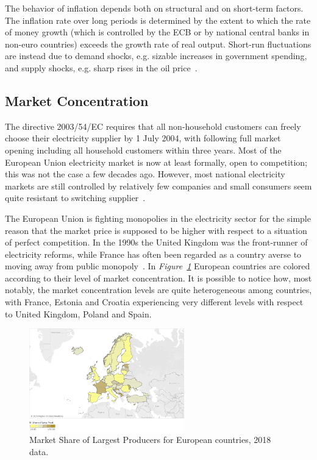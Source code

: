 \documentclass[a4paper,12pt]{book}
\begin{document}
The behavior of inflation depends both on structural and on short-term factors. The inflation rate over long periods is determined by the extent to which the rate of money growth (which is controlled by the ECB or by national central banks in non-euro countries) exceeds the growth rate of real output. Short-run fluctuations are instead due to demand shocks, e.g. sizable increases in government spending, and supply shocks, e.g. sharp rises in the oil price~\cite{ball1993causes}.

\subsection{Market Concentration}

The directive 2003/54/EC requires that all non-household customers can freely choose their electricity supplier by 1 July 2004, with following full market opening including all household customers within three years. Most of the European Union electricity market is now at least formally, open to competition; this was not the case a few decades ago. However, most national electricity markets are still controlled by relatively few companies and small consumers seem quite resistant to switching supplier~\cite{jamasb2005electricity}.

The European Union is fighting monopolies in the electricity sector for the simple reason that the market price is supposed to be higher with respect to a situation of perfect competition. In the 1990s the United Kingdom was the front-runner of electricity reforms, while France has often been regarded as a country averse to moving away from public monopoly~\cite{fiorio2009reform}. In \textit{Figure~\ref{fig:conc}} European countries are colored according to their level of market concentration. It is possible to notice how, most notably, the market concentration levels are quite heterogeneous among countries, with France, Estonia and Croatia experiencing very different levels with respect to United Kingdom, Poland and Spain.

\begin{figure}[tb]
\begin{center}
\captionsetup{justification=centering}
\includegraphics[width=0.6\textwidth]{Images/conc.png}
\caption{Market Share of Largest Producers for European countries, 2018 data. }
\label{fig:conc}
\end{center}
\end{figure}
\end{document}
